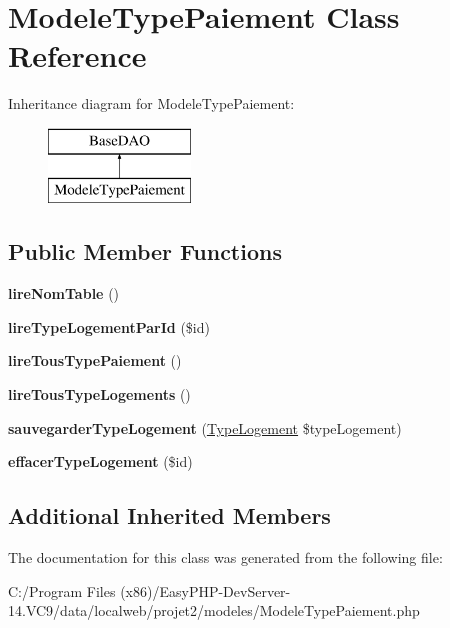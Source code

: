 \hypertarget{class_modele_type_paiement}{}\section{Modele\+Type\+Paiement Class Reference}
\label{class_modele_type_paiement}
Inheritance diagram for Modele\+Type\+Paiement\+:\begin{figure}[H]
\begin{center}
\leavevmode
\includegraphics[height=2.000000cm]{class_modele_type_paiement}
\end{center}
\end{figure}
\subsection*{Public Member Functions}
\begin{DoxyCompactItemize}
\item 
\mbox{\label{class_modele_type_paiement_a31e970e045f95549b40398eb6bbcb0ec}} 
{\bfseries lire\+Nom\+Table} ()
\item 
\mbox{\label{class_modele_type_paiement_ae110cfeea8caf59bb94eec56b5a06698}} 
{\bfseries lire\+Type\+Logement\+Par\+Id} (\$id)
\item 
\mbox{\label{class_modele_type_paiement_acca33ffb62a26a508606b09fd3f4dcfa}} 
{\bfseries lire\+Tous\+Type\+Paiement} ()
\item 
\mbox{\label{class_modele_type_paiement_aab044853b5108df99e9fd5402b819c82}} 
{\bfseries lire\+Tous\+Type\+Logements} ()
\item 
\mbox{\label{class_modele_type_paiement_adff50f0f3f01af8840390c930c15c2cf}} 
{\bfseries sauvegarder\+Type\+Logement} (\hyperlink{class_type_logement}{Type\+Logement} \$type\+Logement)
\item 
\mbox{\label{class_modele_type_paiement_aaee46cdef5a5d25c24eaaab1cc8b88b8}} 
{\bfseries effacer\+Type\+Logement} (\$id)
\end{DoxyCompactItemize}
\subsection*{Additional Inherited Members}


The documentation for this class was generated from the following file\+:\begin{DoxyCompactItemize}
\item 
C\+:/\+Program Files (x86)/\+Easy\+P\+H\+P-\/\+Dev\+Server-\/14.\+V\+C9/data/localweb/projet2/modeles/Modele\+Type\+Paiement.\+php\end{DoxyCompactItemize}
